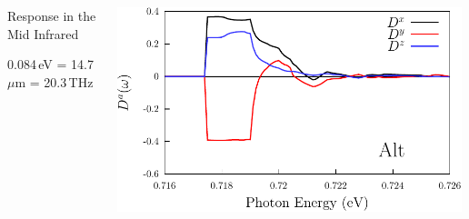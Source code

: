 \documentclass{beamer}
\begin{document}
\begin{frame}
\begin{columns}
\begin{center}
\begin{figure}[h!]
\end{figure}

\vspace{-5mm}

Response in the Mid Infrared

0.084\,eV = 14.7\,$\mu$m = 20.3\,THz

\end{center}

\begin{center}
\small

\vspace{-5mm}   
\includegraphics[width=0.99\textwidth]{figs/plots/dsp-alt.pdf}

\vspace{-4mm}
\begin{figure}[h!]
\end{figure}
\end{center}
\end{columns}
\end{frame}
\end{document}
